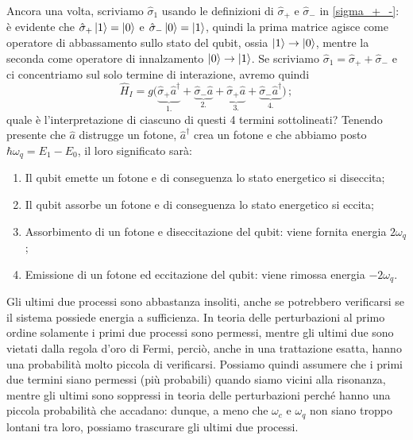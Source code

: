 \noindent Ancora una volta, scriviamo $\hat{\sigma}_1$ usando le definizioni di $\hat \sigma_+$ e $\hat \sigma_-$ in \eqref{sigma_+_-}: è evidente che $\hat \sigma_+ \ket{1} = \ket{0}$ e $\hat \sigma_- \ket{0} = \ket{1}$, quindi la prima matrice agisce come operatore di abbassamento sullo stato del qubit, ossia  $\ket{1} \to \ket{0}$, mentre la seconda come operatore di innalzamento $\ket{0} \to \ket{1}$. Se scriviamo $\hat\sigma_1 = \hat\sigma_++\hat\sigma_-$ e ci concentriamo sul solo termine di interazione, avremo quindi
\begin{equation}\label{H_interaz_4}
    \hat H_I = g\big(
    \underbrace{\hat \sigma_+\hat a^\dagger}_{1.}+
    \underbrace{\hat\sigma_-\hat a}_{2.}+
    \underbrace{\hat\sigma_+\hat a}_{3.}+
    \underbrace{\hat\sigma_-\hat a^\dagger}_{4.}
    \big)\, ;
\end{equation}
quale è l'interpretazione di ciascuno di questi 4 termini sottolineati? Tenendo presente che $\hat{a}$ distrugge un fotone, $\hat{a}^\dag$ crea un fotone e che abbiamo posto $\hbar \omega_q = E_1 - E_0$, il loro significato sarà:
\begin{enumerate}
    \item Il qubit emette un fotone e di conseguenza lo stato energetico si diseccita;
    \item Il qubit assorbe un fotone e di conseguenza lo stato energetico si eccita;
    \item Assorbimento di un fotone e diseccitazione del qubit: viene fornita energia $2 \omega_q$;
    \item Emissione di un fotone ed eccitazione del qubit: viene rimossa energia $-2 \omega_q$.
\end{enumerate}
Gli ultimi due processi sono abbastanza insoliti, anche se potrebbero verificarsi se il sistema possiede energia a sufficienza. In teoria delle perturbazioni al primo ordine solamente i primi due processi sono permessi, mentre gli ultimi due sono vietati dalla regola d'oro di Fermi, perciò, anche in una trattazione esatta, hanno una probabilità molto piccola di verificarsi. Possiamo quindi assumere che i primi due termini siano permessi (più probabili) quando siamo vicini alla risonanza, mentre gli ultimi sono soppressi in teoria delle perturbazioni perché hanno una piccola probabilità che accadano: dunque, a meno che $\omega_c$ e $\omega_q$ non siano troppo lontani tra loro, possiamo trascurare gli ultimi due processi. 


